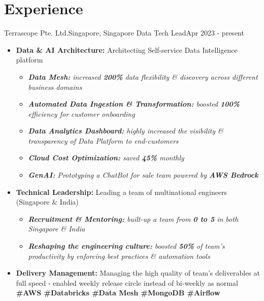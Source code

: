 \def\labelitemi{$\circ$}


\section{Experience}\label{sec:experience}
\resumeSubHeadingListStart

\resumeSubheading
{Terrascope Pte. Ltd.}{Singapore, Singapore}
{Data Tech Lead}{Apr 2023 - present}
\begin{itemize}
    \item \textbf{Data \& AI Architecture:} Architecting Self-service Data Intelligence platform
    \begin{itemize}
        \item{\emph{\textbf{Data Mesh:} increased \textbf{200\%} data flexibility \& discovery across different business domains}}
        \item{\emph{\textbf{Automated Data Ingestion \& Transformation:} boosted \textbf{100\%} efficiency for customer onboarding}}
        \item{\emph{\textbf{Data Analytics Dashboard:} highly increased the visibility \& transparency of Data Platform to end-customers}}
        \item {\emph{\textbf{Cloud Cost Optimization:} saved \textbf{45\%} monthly}}
        \item {\emph{\textbf{GenAI:} Prototyping a ChatBot for sale team powered by \textbf{AWS Bedrock}}}
    \end{itemize}
    \item \textbf{Technical Leadership:} Leading a team of multinational engineers (Singapore \& India)
    \begin{itemize}
        \item{\emph{\textbf{Recruitment \& Mentoring:} built-up a team from \textbf{0 to 5} in both Singapore \& India}}
        \item{\emph{\textbf{Reshaping the engineering culture:} boosted \textbf{50\%} of team's productivity by enforcing best practices \& automation tools}}
    \end{itemize}
    \item \textbf{Delivery Management:} Managing the high quality of team's deliverables at full speed - enabled weekly release circle instead of bi-weekly as normal
    \textbf{\scriptsize{\#AWS \#Databricks \#Data Mesh \#MongoDB \#Airflow}}
\end{itemize}


